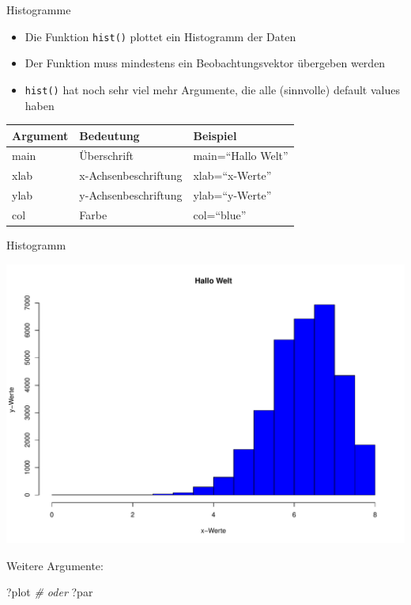\documentclass[ignorenonframetext,]{beamer}
\newenvironment{Shaded}{}{}
\newcommand{\KeywordTok}[1]{\textcolor[rgb]{0.00,0.44,0.13}{\textbf{{#1}}}}
\newcommand{\DataTypeTok}[1]{\textcolor[rgb]{0.56,0.13,0.00}{{#1}}}
\newcommand{\StringTok}[1]{\textcolor[rgb]{0.25,0.44,0.63}{{#1}}}
\newcommand{\CommentTok}[1]{\textcolor[rgb]{0.38,0.63,0.69}{\textit{{#1}}}}
\newcommand{\NormalTok}[1]{{#1}}
\providecommand{\tightlist}{%
\setlength{\itemsep}{0pt}\setlength{\parskip}{0pt}}
\begin{document}
\begin{frame}[fragile]{Histogramme}

\begin{itemize}
\tightlist
\item
  Die Funktion \texttt{hist()} plottet ein Histogramm der Daten
\item
  Der Funktion muss mindestens ein Beobachtungsvektor übergeben werden
\item
  \texttt{hist()} hat noch sehr viel mehr Argumente, die alle
  (sinnvolle) default values haben
\end{itemize}

\begin{longtable}[]{@{}lll@{}}
\toprule
Argument & Bedeutung & Beispiel\tabularnewline
\midrule
\endhead
main & Überschrift & main=``Hallo Welt''\tabularnewline
xlab & x-Achsenbeschriftung & xlab=``x-Werte''\tabularnewline
ylab & y-Achsenbeschriftung & ylab=``y-Werte''\tabularnewline
col & Farbe & col=``blue''\tabularnewline
\bottomrule
\end{longtable}

\end{frame}

\begin{frame}[fragile]{Histogramm}

\begin{Shaded}
\end{Shaded}

\includegraphics{R_intern_files/figure-beamer/unnamed-chunk-151-1.pdf}

Weitere Argumente:

\begin{Shaded}
\begin{Highlighting}[]
\NormalTok{?plot}
\CommentTok{# oder}
\NormalTok{?par}
\end{Highlighting}
\end{Shaded}

\end{frame}
\end{document}

